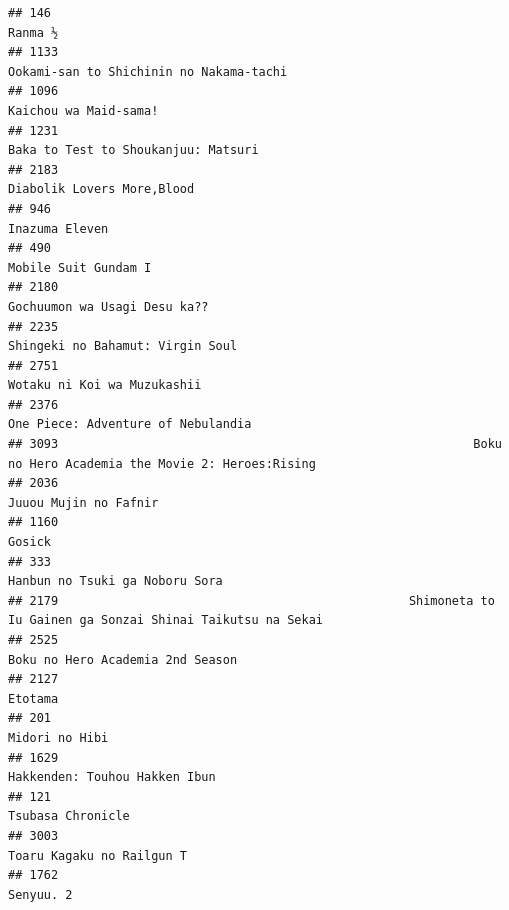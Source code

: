 \documentclass[
]{article}
\begin{document}
\begin{verbatim}
## 146                                                                                                    Ranma ½
## 1133                                                                   Ookami-san to Shichinin no Nakama-tachi
## 1096                                                                                     Kaichou wa Maid-sama!
## 1231                                                                       Baka to Test to Shoukanjuu: Matsuri
## 2183                                                                                Diabolik Lovers More,Blood
## 946                                                                                             Inazuma Eleven
## 490                                                                                       Mobile Suit Gundam I
## 2180                                                                              Gochuumon wa Usagi Desu ka??
## 2235                                                                          Shingeki no Bahamut: Virgin Soul
## 2751                                                                               Wotaku ni Koi wa Muzukashii
## 2376                                                                        One Piece: Adventure of Nebulandia
## 3093                                                          Boku no Hero Academia the Movie 2: Heroes:Rising
## 2036                                                                                     Juuou Mujin no Fafnir
## 1160                                                                                                    Gosick
## 333                                                                             Hanbun no Tsuki ga Noboru Sora
## 2179                                                 Shimoneta to Iu Gainen ga Sonzai Shinai Taikutsu na Sekai
## 2525                                                                          Boku no Hero Academia 2nd Season
## 2127                                                                                                   Etotama
## 201                                                                                             Midori no Hibi
## 1629                                                                             Hakkenden: Touhou Hakken Ibun
## 121                                                                                          Tsubasa Chronicle
## 3003                                                                                 Toaru Kagaku no Railgun T
## 1762                                                                                                 Senyuu. 2

\end{verbatim}
\end{document}

